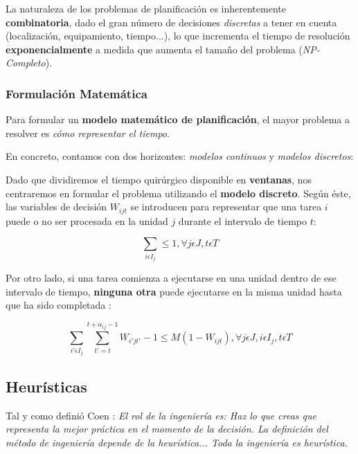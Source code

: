 La naturaleza de los problemas de planificación es inherentemente \textbf{combinatoria}, dado el gran número de decisiones \textit{discretas} a tener en cuenta (localización, equipamiento, tiempo...), lo que incrementa el tiempo de resolución \textbf{exponencialmente} a medida que aumenta el tamaño del problema (\textit{NP-Completo}\cite{Garey1990ComputersNP-Completeness}).

\subsubsection{Formulación Matemática}

Para formular un \textbf{modelo matemático de planificación}, el mayor problema a resolver es \textit{cómo representar el tiempo}. 

En concreto, contamos con dos horizontes: \textit{modelos continuos} y \textit{modelos discretos}:


Dado que dividiremos el tiempo quirúrgico disponible en \textbf{ventanas}, nos centraremos en formular el problema utilizando el \textbf{modelo discreto}.
Según éste, las variables de decisión $W_{ijt}$ se introducen para representar que una tarea $i$ puede o no ser procesada en la unidad $j$ durante el intervalo de tiempo $t$:

\begin{equation}
    \sum_{i \epsilon I_{j}} \leq 1, \forall j \epsilon J, t \epsilon T
\end{equation}

Por otro lado, si una tarea comienza a ejecutarse en una unidad dentro de ese intervalo de tiempo, \textbf{ninguna otra} puede ejecutarse en la misma unidad hasta que ha sido completada \cite{Floudas2005MixedApplications}:

\begin{equation}
    \sum_{i'\epsilon I_{j}} \sum_{t' = t}^{t+\alpha_{ij}-1} W_{i'jt'} - 1 \leq M(1-W_{ijt}), \forall j \epsilon J, i \epsilon I_{j}, t \epsilon T
\end{equation}


\subsection{Heurísticas} \label{heur}

Tal y como definió Coen \cite{Koen1984TowardMethod}: \textit{El rol de la ingeniería es: Haz lo que creas que representa la mejor práctica en el momento de la decisión. La definición del método de ingeniería depende de la heurística... Toda la ingeniería es heurística.}

